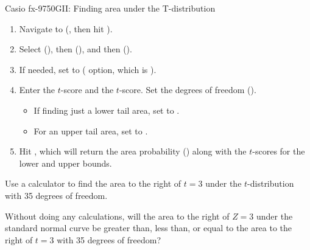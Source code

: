 \begin{onebox}{Casio fx-9750GII: Finding area under the T-distribution}
\begin{enumerate}
\setlength{\itemsep}{0mm}
\item Navigate to  (, then hit ).
\item Select  (), then  (), and then  ().
\item If needed, set  to  ( option, which is ).
\item Enter the  $t$-score and the  $t$-score. Set the degrees of freedom ().\vspace{-1.5mm}
  \begin{itemize}
  \setlength{\itemsep}{0mm}
  \item If finding just a lower tail area, set  to .
  \item For an upper tail area, set  to .
  \end{itemize}
\item Hit , which will return the area probability () along with the $t$-scores for the lower and upper bounds.
\end{enumerate}
\end{onebox}
 
\begin{exercisewrap}
\begin{nexercise}Use a calculator to find the area to the right of $t=3$ under the $t$-distribution with 35 degrees of freedom.\footnotemark
\end{nexercise}
\end{exercisewrap}

\begin{exercisewrap}
\begin{nexercise}Without doing any calculations, will the area to the right of $Z=3$ under the standard normal curve be greater than, less than, or equal to the area to the right of $t=3$ with 35 degrees of freedom?\footnotemark
\end{nexercise}
\end{exercisewrap} 

